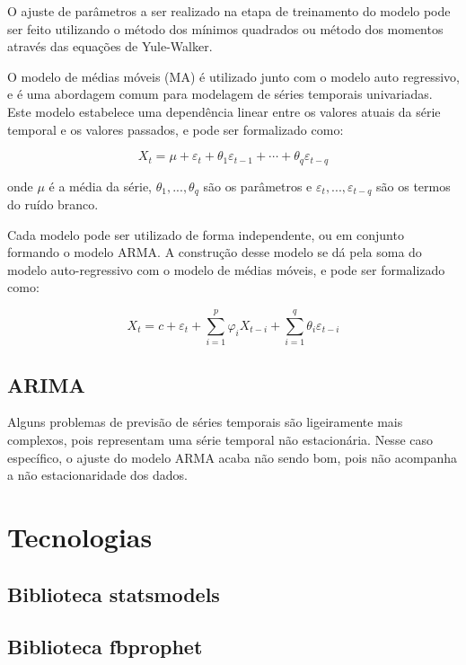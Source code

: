 O ajuste de parâmetros a ser realizado na etapa de treinamento do modelo pode ser feito utilizando o método dos mínimos quadrados ou método dos momentos através das equações de Yule-Walker.

O modelo de médias móveis (MA) é utilizado junto com o modelo auto regressivo, e é uma abordagem comum para modelagem de séries temporais univariadas. Este modelo estabelece uma dependência linear entre os valores atuais da série temporal e os valores passados, e pode ser formalizado como:

\[X_{t}=\mu+\varepsilon_{t}+\theta_{1} \varepsilon_{t-1}+\cdots+\theta_{q} \varepsilon_{t-q}\]

onde $\mu$ é a média da série, $\theta_{1}, ..., \theta_{q}$ são os parâmetros e $\varepsilon_{t}, ..., \varepsilon_{t-q}$ são os termos do ruído branco.

Cada modelo pode ser utilizado de forma independente, ou em conjunto formando o modelo ARMA. A construção desse modelo se dá pela soma do modelo auto-regressivo com o modelo de médias móveis, e pode ser formalizado como:

\[X_{t}=c+\varepsilon_{t}+\sum_{i=1}^{p} \varphi_{i} X_{t-i}+\sum_{i=1}^{q} \theta_{i} \varepsilon_{t-i}\]

\subsection{ARIMA}
Alguns problemas de previsão de séries temporais são ligeiramente mais complexos, pois representam uma série temporal não estacionária. Nesse caso específico, o ajuste do modelo ARMA acaba não sendo bom, pois não acompanha a não estacionaridade dos dados.



\section{Tecnologias}
\subsection{Biblioteca statsmodels}


\subsection{Biblioteca fbprophet}
\cite{fbprophet}



